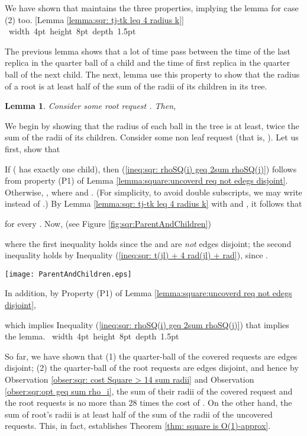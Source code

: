 \documentclass[11pt]{article}
\newtheorem{lem}[theorem]{Lemma}
\def\proof{\par\noindent{\bf Proof:~}}
\def\blackslug{\hbox{\hskip 1pt \vrule width 4pt height 8pt
    depth 1.5pt \hskip 1pt}}
\def\QED{\quad\blackslug\lower 8.5pt\null\par}
\begin{document}
\noindent We have shown that  maintains the three properties, implying the lemma for case (2) too.
[Lemma \ref{lemma:sqr: tj-tk leq 4 radius k}]
\QED









The previous lemma shows that a lot of time pass between the time of the last replica in the quarter ball of a child and the time of first replica in the quarter ball of the next child.
The next, lemma use this property to show that the radius of a root is at least half of the sum of the radii of its children in its tree.



\begin{lem}
Consider some root request .
Then,

\label{lema:sqr:root radi geq sum of its children}
\end{lem}
\proof
We begin by showing that the radius of each ball  in the tree is at least, twice the sum of the radii of its children.
Consider some non leaf request  (that is, ).
Let us first, show that

If  ( has exactly one child), then (\ref{ineq:sqr: rhoSQ(i) geq 2sum rhoSQ(j)}) follows from
property (P1) of Lemma \ref{lemma:square:uncoverd req not edegs disjoint}.
Otherwise, , where  and .
(For simplicity, to avoid double subscripts, we may write  instead of .)
By Lemma \ref{lemma:sqr: tj-tk leq 4 radius k} with  and , it follows that

for every .
Now, (see Figure \ref{fig:sqr:ParentAndChildren})

where the first inequality holds since the  and  are {\em not} edges disjoint;
the second inequality holds by Inequality (\ref{ineq:sqr: t(jl) + 4 rad(jl) + rad}), since .
\begin{figure*}
\begin{center}
\texttt{[image: ParentAndChildren.eps]}
\end{center}
\caption{\sf Geometric vision on a parent and its children relationships.
\label{fig:sqr:ParentAndChildren}
}
\end{figure*}
In addition, by Property (P1) of Lemma
\ref{lemma:square:uncoverd req not edegs disjoint},

which implies Inequality (\ref{ineq:sqr: rhoSQ(i) geq 2sum rhoSQ(j)})
that implies the lemma.
\QED




So far, we have shown that
(1) the quarter-ball of the covered requests are edges disjoint;
(2) the quarter-ball of the root requests are edges disjoint, and hence by Observation \ref{obser:sqr: cost Square > 14 sum radii} and Observation \ref{obser:sqr:opt geq sum rho_i}, the sum of their radii of the covered request and the root requests is no more than 28 times the cost of .
On the other hand,
the sum of root's radii is at least half of the sum of the radii of the uncovered requests.
This, in fact, establishes Theorem \ref{thm: square is O(1)-approx}.
\end{document}
